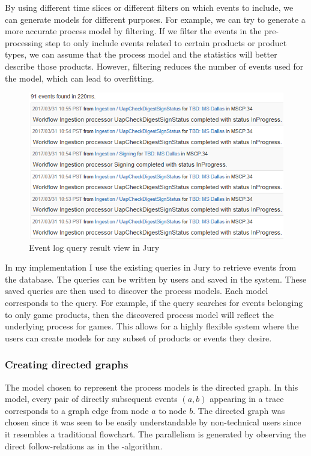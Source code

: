 By using different time slices or different filters on which events to include, we can generate models for different purposes. 
For example, we can try to generate a more accurate process model by filtering.
If we filter the events in the pre-processing step to only include events related to certain products
or product types, we can assume that the process model and the statistics will better describe those products.
However, filtering reduces the number of events used for the model, which can lead to overfitting.

\begin{figure}[htb]
    \centering \includegraphics[width=0.7\linewidth]{gfx/plaineventlog.png}
    \caption{Event log query result view in Jury}
    \label{fig:plaineventlog}
\end{figure}

In my implementation I use the existing queries in Jury to retrieve events from the database. The queries can be written by users and saved in the system.
These saved queries are then used to discover the process models.
Each model corresponds to the query.
For example, if the query searches for events belonging to only game products, then the discovered process model will reflect the underlying process for games.
This allows for a highly flexible system where the users can create models for any subset of products or events they desire. 

\subsubsection{Creating directed graphs}

The model chosen to represent the process models is the directed graph. 
In this model, every pair of directly subsequent events $(a,b)$ appearing in a trace corresponds to a 
graph edge from node $a$ to node $b$.
The directed graph was chosen since it was seen to be easily understandable by non-technical users since it resembles a traditional flowchart.
The parallelism is generated by observing the direct follow-relations as in the \textalpha-algorithm.

